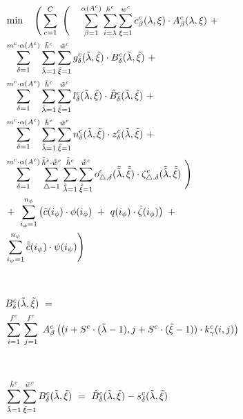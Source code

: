 \documentclass{article}
\begin{document}
\begin{align}
&\min \quad \Bigg( \sum_{c=1}^C \ \Bigg( \quad \sum_{\beta=1}^{\alpha(A^c)} \sum_{i=\lambda}^{h^c} \sum_{\xi=1}^{w^c} c_\beta^c(\lambda,\xi) \cdot A_\beta^c(\lambda,\xi) \ + \label{obj_fct_conv_77} \\
& \sum_{\delta=1}^{m^c \cdot \alpha(A^c)} \sum_{\tilde{\lambda}=1}^{\tilde{h}^c} \sum_{\tilde{\xi} = 1}^{\tilde{w}^c} g_\delta^c(\tilde{\lambda}, \tilde{\xi}) \cdot B_\delta^c(\tilde{\lambda}, \tilde{\xi}) \ + \label{obj_fct_conv_78} \\
& \sum_{\delta=1}^{m^c \cdot \alpha(A^c)} \sum_{\tilde{\lambda}=1}^{\tilde{h}^c} \sum_{\tilde{\xi} = 1}^{\tilde{w}^c} l_\delta^c(\tilde{\lambda},\tilde{\xi}) \cdot \hat{B}_\delta^c(\tilde{\lambda}, \tilde{\xi}) \ + \label{obj_fct_conv_79} \\
& \sum_{\delta = 1}^{m^c \cdot \alpha(A^c)} \sum_{\tilde{\lambda}=1}^{\tilde{h}^c} \sum_{\tilde{\xi}=1}^{\tilde{w}^c} n_\delta^c(\tilde{\lambda},\tilde{\xi}) \cdot  z_\delta^c(\tilde{\lambda},\tilde{\xi}) \ + \label{obj_fct_conv_80} \\
&\sum_{\delta = 1}^{m^c \cdot \alpha(A^c)} \sum_{\triangle = 1}^{\tilde{\tilde{h}}^c \cdot \tilde{\tilde{w}}^c} \sum_{\tilde{\tilde{\lambda}}=1}^{\tilde{\tilde{h}}^c} \sum_{\tilde{\tilde{\xi}}=1}^{\tilde{\tilde{w}}^c} o_{\triangle, \delta}^c(\tilde{\tilde{\lambda}}, \tilde{\tilde{\xi}}) \cdot \zeta_{\triangle, \delta}^c(\tilde{\tilde{\lambda}},\tilde{\tilde{\xi}}) \ \Bigg) \label{obj_fct_conv_81}\\
&+ \ \sum_{i_\phi = 1}^{n_\phi} \left( \tilde{c}(i_\phi) \cdot \phi(i_\phi) \ + \ q(i_\phi) \cdot \tilde{\zeta}(i_\phi) \right) \ + \ \label{obj_fct_conv_82}\\
&\sum_{i_\psi = 1}^{n_\psi}  \tilde{\tilde{c}}(i_\psi) \cdot \psi(i_\psi) \Bigg) \label{obj_fct_conv_83} \\
\notag \\
\notag \\
&B_\delta^c(\tilde{\lambda},\tilde{\xi}) \ = \ \notag \\
&\sum_{i=1}^{f^c} \, \sum_{j=1}^{f^c} \ A_\beta^c\left((i+S^c\cdot(\tilde{\lambda}-1),j+S^c\cdot(\tilde{\xi} -1)) \cdot k_\gamma^c(i,j)\right) \label{const_conv_84}\\
\notag \\
\notag \\
&\sum_{\tilde{\lambda}=1}^{\tilde{h}^c} \sum_{\tilde{\xi}=1}^{\tilde{w}^c} B_\delta^c (\tilde{\lambda},\tilde{\xi}) \ = \ \hat{B}_\delta^c(\tilde{\lambda},\tilde{\xi}) - s^c_\delta(\tilde{\lambda},\tilde{\xi})  \label{const_relu_85} \\

\end{align}
\end{document}
